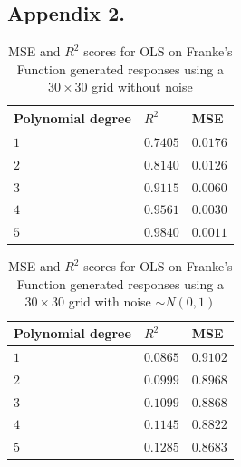\documentclass[%
oneside,                 %
final,                   %
10pt]{article}
\begin{document}
\begin{appendices}
\section*{Appendix 2.} \label{APP_2}
\begin{table}[h!]
\begin{center}
\begin{tabular}{lll}
\hline
 Polynomial degree   & $R^2$      & MSE        \\
\hline
 $ 1 $               & $ 0.7405 $ & $ 0.0176 $ \\
 $ 2 $               & $ 0.8140 $ & $ 0.0126 $ \\
 $ 3 $               & $ 0.9115 $ & $ 0.0060 $ \\
 $ 4 $               & $ 0.9561 $ & $ 0.0030 $ \\
 $ 5 $               & $ 0.9840 $ & $ 0.0011 $ \\
\hline
\end{tabular}
\end{center}
\caption{MSE and $R^2$ scores for OLS on  Franke's Function generated responses using a $30\times 30$ grid without noise}
\label{table:OLS_mse_r2}
\end{table}

\begin{table}[h!]
\begin{center}
\begin{tabular}{lll}
\hline
 Polynomial degree   & $R^2$      & MSE        \\
\hline
 $ 1 $               & $ 0.0865 $ & $ 0.9102 $ \\
 $ 2 $               & $ 0.0999 $ & $ 0.8968 $ \\
 $ 3 $               & $ 0.1099 $ & $ 0.8868 $ \\
 $ 4 $               & $ 0.1145 $ & $ 0.8822 $ \\
 $ 5 $               & $ 0.1285 $ & $ 0.8683 $ \\
\hline
\end{tabular}
\end{center}
\caption{MSE and $R^2$ scores for OLS on  Franke's Function generated responses using a $30\times 30$ grid with noise $\sim N(0,1)$ }
\label{table:OLS_mse_r2}
\end{table}



\end{appendices}
\end{document}
